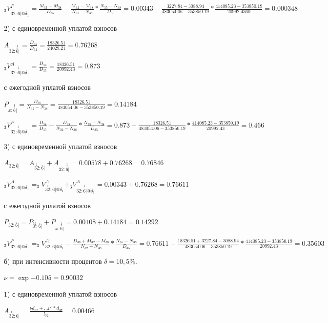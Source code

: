 \documentclass[12pt,a4paper, oneside]{extreport}
\begin{document}
$_3V_{  \overset{1}{32} : \bar{6}|@\delta_1}^P =  \frac{M_{35}-M_{38}}{D_{35}}  -  \frac{M_{32}-M_{38}}{N_{32}-N_{38}} * \frac{N_{35}-N_{38}}{D_{35}}  = 0.00343  -  \frac{3227.84-3088.94}{483054.06-353850.19} * \frac{414085.23-353850.19}{20992.4360}  =  0.000348$



2) с единовременной уплатой взносов

$ A_{32:  \overset{1}{\bar{6}}|} = \frac{D_{38}}{D_{32}} = 
\frac{18326.51}{24029.21} = 0.76268$

$_3V_{  32:  \overset{1}{\bar{6}}|@\delta_1}^A = \frac{D_{38}}{D_{35}} =  \frac{18326.51}{20992.43} = 0.873  $

с ежегодной уплатой взносов


 $ P_{ x:  \overset{1}{\bar{6}}|} = \frac{D_{38}}{N_{32}-N_{38}}= \frac{18326.51}{483054.06 - 353850.19}= 0.14184$

$_3V_{ 32:  \overset{1}{\bar{6}}|@\delta_1}^P = \frac{D_{38}}{D_{35}}  - \frac{D_{38}}{N_{32}-N_{38}}  * \frac{N_{35}-N_{38}}{D_{35}}  =   0.873   - \frac{18326.51}{483054.06-353850.19}  * \frac{414085.23-353850.19}{20992.43} = 0.466 $




3) с единовременной уплатой взносов 

$ A_{32: \bar{6}|} = A_{  \overset{1}{32} : \bar{6}|} + A_{32:  \overset{1}{\bar{6}}|} = 0.00578 + 0.76268 = 0.76846$


$_3V_{ 32: \bar{6}|@\delta_1}^A =  _3V_{  \overset{1}{32} : \bar{6}|@\delta_1}^A + _3V_{  32:  \overset{1}{\bar{6}}|@\delta_1}^A  =  0.00343 + 0.76268 =0.76611 $


с ежегодной уплатой взносов

$ P_{ 32:  \bar{6}| } = P_{ \overset{32}{x} : \bar{6}|} +  P_{ x:  \overset{1}{\bar{6}}|}  = 0.00108 + 0.14184 = 0.14292$

$_3V_{ 32: \bar{6}|@\delta_1}^P = _3V_{ 32: \bar{6}|@\delta_1}^A -
 \frac{D_{38}+M_{32}-M_{38}}{N_{32}-N_{38}}  * \frac{N_{35}-N_{38}}{D_{35}} = 0.76611   - \frac{18326.51+ 3227.84 - 3088.94}{483054.06-353850.19}  * \frac{414085.23-353850.19}{20992.43} = 0.35603
$


б) при интенсивности процентов $\delta=10,5\%$.

$\nu=\exp{-0.105} = 0.90032 $

1) с единовременной уплатой взносов

$ A_{  \overset{1}{32} : \bar{6}|} = \frac{\nu d_{32} + ... \nu^6*d_{37}}{l_{32}} = 0.00466$
\end{document}
